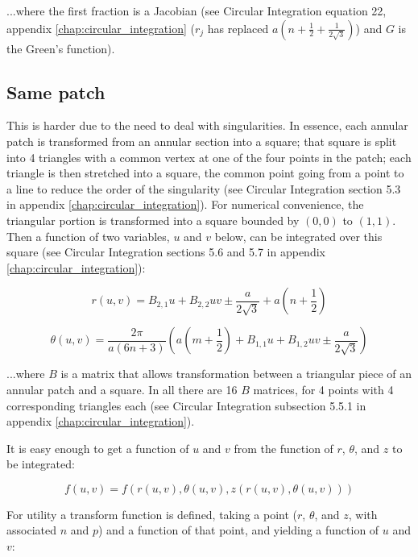 \documentclass[etd,senior,noacknowledgments]{BYUPhys}
\begin{document}
...where the first fraction is a Jacobian (see Circular Integration equation 22, appendix \ref{chap:circular_integration} ($r_{j}$ has replaced $a\left(n+\frac{1}{2}+\frac{1}{2\sqrt{3}}\right)$) and $G$ is the Green's function).

\subsection{Same patch} \label{sec:same_patch}

This is harder due to the need to deal with singularities. In essence, each annular patch is transformed from an annular section into a square; that square is split into 4 triangles with a common vertex at one of the four points in the patch; each triangle is then stretched into a square, the common point going from a point to a line to reduce the order of the singularity (see Circular Integration section 5.3 in appendix \ref{chap:circular_integration}). For numerical convenience, the triangular portion is transformed into a square bounded by $(0,0)$ to $(1,1)$. Then a function of two variables, $u$ and $v$ below, can be integrated over this square (see Circular Integration sections 5.6 and 5.7 in appendix \ref{chap:circular_integration}):

\begin{equation}
  r\left(u,v\right)=B_{2,1}u+B_{2,2}uv\pm\frac{a}{2\sqrt{3}}+a\left(n+\frac{1}{2}\right)
\end{equation}

\begin{equation}
  \theta\left(u,v\right)=\frac{2\pi}{a(6n+3)}\left(a\left(m+\frac{1}{2}\right)+B_{1,1}u+B_{1,2}uv\pm\frac{a}{2\sqrt{3}}\right)
\end{equation}

...where $B$ is a matrix that allows transformation between a triangular piece of an annular patch and a square. In all there are 16 $B$ matrices, for 4 points with 4 corresponding triangles each (see Circular Integration subsection 5.5.1 in appendix \ref{chap:circular_integration}).

It is easy enough to get a function of $u$ and $v$ from the function of $r$, $\theta$, and $z$ to be integrated:

\begin{equation}
  f\left(u,v\right)=f\left(r\left(u,v\right),\theta\left(u,v\right),z\left(r\left(u,v\right),\theta\left(u,v\right)\right)\right)
\end{equation}

For utility a transform function is defined, taking a point ($r$, $\theta$, and $z$, with associated $n$ and $p$) and a function of that point, and yielding a function of $u$ and $v$:
\end{document}

